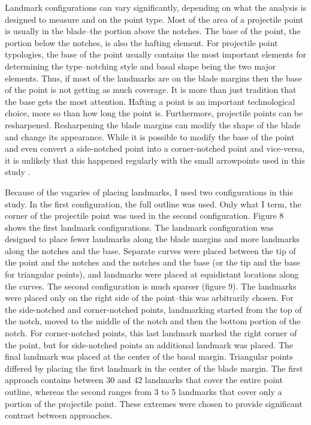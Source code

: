 \documentclass[a4paper]{article}
\begin{document}
Landmark configurations can vary significantly, depending on what the analysis is designed to measure and on the point type. Most of the area of a projectile point is usually in the blade--the portion above the notches. The base of the point, the portion below the notches, is also the hafting element. For projectile point typologies, the base of the point usually contains the most important elements for determining the type--notching style and basal shape being the two major elements. Thus, if most of the landmarks are on the blade margins then the base of the point is not getting as much coverage. It is more than just tradition that the base gets the most attention. Hafting a point is an important technological choice, more so than how long the point is. Furthermore, projectile points can be resharpened. Resharpening the blade margins can modify the shape of the blade and change its appearance. While it is possible to modify the base of the point and even convert a side-notched point into a corner-notched point and vice-versa, it is unlikely that this happened regularly with the small arrowpoints used in this study \autocite{Loendorf2019-df}.

Because of the vagaries of placing landmarks, I used two configurations in this study. In the first configuration, the full outline was used. Only what I term, the corner of the projectile point was used in the second configuration. Figure 8 shows the first landmark configurations. The landmark configuration was designed to place fewer landmarks along the blade margins and more landmarks along the notches and the base. Separate curves were placed between the tip of the point and the notches and the notches and the base (or the tip and the base for triangular points), and landmarks were placed at equidistant locations along the curves. The second configuration is much sparser (figure 9). The landmarks were placed only on the right side of the point--this was arbitrarily chosen. For the side-notched and corner-notched points, landmarking started from the top of the notch, moved to the middle of the notch and then the bottom portion of the notch. For corner-notched points, this last landmark marked the right corner of the point, but for side-notched points an additional landmark was placed. The final landmark was placed at the center of the basal margin. Triangular points differed by placing the first landmark in the center of the blade margin. The first approach contains between 30 and 42 landmarks that cover the entire point outline, whereas the second ranges from 3 to 5 landmarks that cover only a portion of the projectile point. These extremes were chosen to provide significant contrast between approaches.
\end{document}

